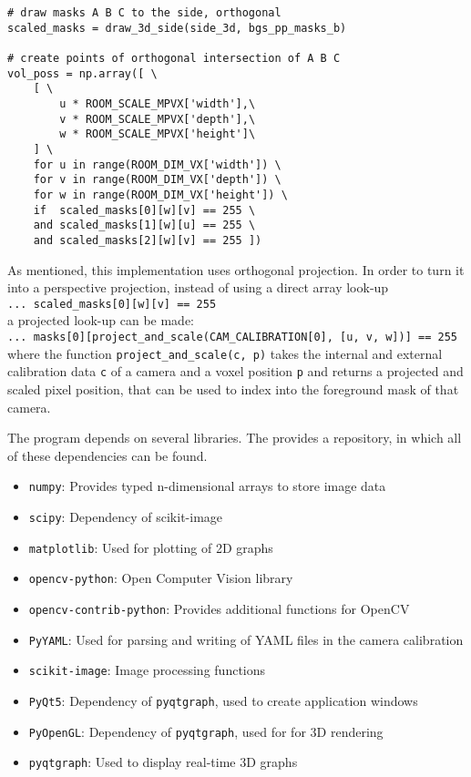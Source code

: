 \begin{lstlisting}[caption={Orthogonal volume intersection implementation}, label={lst:impl:volintersect}]
# draw masks A B C to the side, orthogonal
scaled_masks = draw_3d_side(side_3d, bgs_pp_masks_b)

# create points of orthogonal intersection of A B C
vol_poss = np.array([ \
    [ \
        u * ROOM_SCALE_MPVX['width'],\
        v * ROOM_SCALE_MPVX['depth'],\
        w * ROOM_SCALE_MPVX['height']\
    ] \
    for u in range(ROOM_DIM_VX['width']) \
    for v in range(ROOM_DIM_VX['depth']) \
    for w in range(ROOM_DIM_VX['height']) \
    if  scaled_masks[0][w][v] == 255 \
    and scaled_masks[1][w][u] == 255 \
    and scaled_masks[2][w][v] == 255 ])
\end{lstlisting}

As mentioned, this implementation uses orthogonal projection.
In order to turn it into a perspective projection, instead of using a direct array look-up \\
\texttt{... scaled\_masks[0][w][v] == 255} \\
a projected look-up can be made:\\
\texttt{... masks[0][project\_and\_scale(CAM\_CALIBRATION[0], [u, v, w])] == 255} \\
where the function \texttt{project\_and\_scale(c, p)} takes the internal and external calibration data \texttt{c} of a camera and a voxel position \texttt{p} and returns a projected and scaled pixel position, that can be used to index into the foreground mask of that camera.

The program depends on several libraries.
The \textcite{python2018pypi} provides a repository, in which all of these dependencies can be found.
\begin{itemize}[noitemsep]
    \item \texttt{numpy}:  Provides typed n-dimensional arrays to store image data
    \item \texttt{scipy}:  Dependency of scikit-image
    \item \texttt{matplotlib}: Used for plotting of 2D graphs
    \item \texttt{opencv-python}: Open Computer Vision library
    \item \texttt{opencv-contrib-python}: Provides additional functions for OpenCV
    \item \texttt{PyYAML}: Used for parsing and writing of \ac{YAML} files in the camera calibration
    \item \texttt{scikit-image}: Image processing functions  
    \item \texttt{PyQt5}: Dependency of \texttt{pyqtgraph}, used to create application windows
    \item \texttt{PyOpenGL}: Dependency of \texttt{pyqtgraph}, used for for \ac{3D} rendering 
    \item \texttt{pyqtgraph}: Used to display real-time 3D graphs
\end{itemize}

